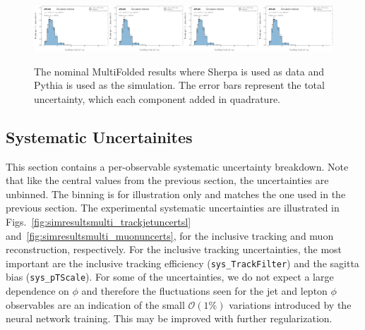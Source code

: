\begin{figure}[h!]
\includegraphics[width=0.25\textwidth,page=21]{figures/SimResults/MultiFoldTotalErrors.pdf}\includegraphics[width=0.25\textwidth,page=22]{figures/SimResults/MultiFoldTotalErrors.pdf}\includegraphics[width=0.25\textwidth,page=23]{figures/SimResults/MultiFoldTotalErrors.pdf}\includegraphics[width=0.25\textwidth,page=24]{figures/SimResults/MultiFoldTotalErrors.pdf}
\caption{The nominal MultiFolded results where Sherpa is used as data and Pythia is used as the simulation. The error bars represent the total uncertainty, which each component added in quadrature.}
\label{fig:simresultsmulti_nominal}
\end{figure}

\subsection{Systematic Uncertainites}
\label{sec:multifolduncerts}

This section contains a per-observable systematic uncertainty breakdown.  Note that like the central values from the previous section, the uncertainties are unbinned.  The binning is for illustration only and matches the one used in the previous section.  The experimental systematic uncertainties are illustrated in Figs.~\ref{fig:simresultsmulti_trackjetuncertsl} and~\ref{fig:simresultsmulti_muonuncerts}, for the inclusive tracking and muon reconstruction, respectively.  For the inclusive tracking uncertainties, the most important are the inclusive tracking efficiency (\texttt{sys\_TrackFilter}) and the sagitta bias (\texttt{sys\_pTScale}).  For some of the uncertainties, we do not expect a large dependence on $\phi$ and therefore the fluctuations seen for the jet and lepton $\phi$ observables are an indication of the small $\mathcal{O}(1\%)$ variations introduced by the neural network training.  This may be improved with further regularization.

